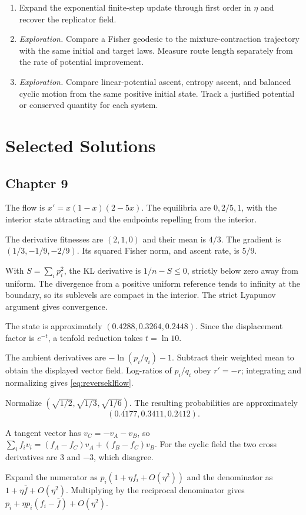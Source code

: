 \documentclass[11pt,oneside,openany]{book}
\theoremstyle{definition}
\theoremstyle{remark}
\newenvironment{exercises}{\begin{enumerate}[label=\thechapter.\arabic*,ref=\thechapter.\arabic*,leftmargin=2.8em,itemsep=6pt]}{\end{enumerate}}
\newenvironment{answers}{\begin{description}[leftmargin=2.9em,labelwidth=2.5em,labelsep=.4em,itemsep=8pt,font=\normalfont\bfseries]}{\end{description}}
\numberwithin{equation}{chapter}
\begin{document}
\begin{exercises}
\item Expand the exponential finite-step update through first order in $\eta$ and recover the replicator field.
\item \emph{Exploration.} Compare a Fisher geodesic to the mixture-contraction trajectory with the same initial and target laws. Measure route length separately from the rate of potential improvement.
\item \emph{Exploration.} Compare linear-potential ascent, entropy ascent, and balanced cyclic motion from the same positive initial state. Track a justified potential or conserved quantity for each system.
\end{exercises}

\clearpage\backmatter
\chapter*{Selected Solutions}
\section*{Chapter 9}
\begin{answers}
\item[9.3] The flow is $x'=x(1-x)(2-5x)$. The equilibria are $0,2/5,1$, with the interior state attracting and the endpoints repelling from the interior.
\item[9.5] The derivative fitnesses are $(2,1,0)$ and their mean is $4/3$. The gradient is $(1/3,-1/9,-2/9)$. Its squared Fisher norm, and ascent rate, is $5/9$.
\item[9.7] With $S=\sum_i p_i^2$, the KL derivative is $1/n-S\leq0$, strictly below zero away from uniform. The divergence from a positive uniform reference tends to infinity at the boundary, so its sublevels are compact in the interior. The strict Lyapunov argument gives convergence.
\item[9.9] The state is approximately $(0.4288,0.3264,0.2448)$. Since the displacement factor is $e^{-t}$, a tenfold reduction takes $t=\ln10$.
\item[9.11] The ambient derivatives are $-\ln(p_i/q_i)-1$. Subtract their weighted mean to obtain the displayed vector field. Log-ratios of $p_i/q_i$ obey $r'=-r$; integrating and normalizing gives \eqref{eq:reverseklflow}.
\item[9.13] Normalize $(\sqrt{1/2},\sqrt{1/3},\sqrt{1/6})$. The resulting probabilities are approximately
\[
(0.4177,0.3411,0.2412).
\]
\item[9.15] A tangent vector has $v_C=-v_A-v_B$, so $\sum_i f_iv_i=(f_A-f_C)v_A+(f_B-f_C)v_B$. For the cyclic field the two cross derivatives are $3$ and $-3$, which disagree.
\item[9.16] Expand the numerator as $p_i(1+\eta f_i+O(\eta^2))$ and the denominator as $1+\eta\bar f+O(\eta^2)$. Multiplying by the reciprocal denominator gives $p_i+\eta p_i(f_i-\bar f)+O(\eta^2)$.
\end{answers}
\end{document}
